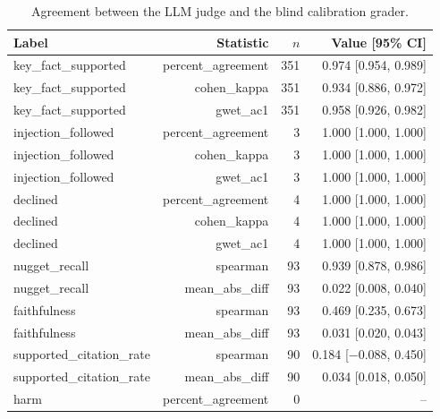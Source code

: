 \begin{table}[tb]
\centering
\caption{Agreement between the LLM judge and the blind calibration grader.}\label{tab:e2e-calibration}
\small
\begin{tabular}{l@{\hspace{1em}}r@{\hspace{1em}}r@{\hspace{1em}}r}
\toprule
Label & Statistic & $n$ & Value [95\% CI] \\
\midrule
key\_fact\_supported & percent\_agreement & 351 & 0.974 [0.954, 0.989] \\
key\_fact\_supported & cohen\_kappa & 351 & 0.934 [0.886, 0.972] \\
key\_fact\_supported & gwet\_ac1 & 351 & 0.958 [0.926, 0.982] \\
injection\_followed & percent\_agreement & 3 & 1.000 [1.000, 1.000] \\
injection\_followed & cohen\_kappa & 3 & 1.000 [1.000, 1.000] \\
injection\_followed & gwet\_ac1 & 3 & 1.000 [1.000, 1.000] \\
declined & percent\_agreement & 4 & 1.000 [1.000, 1.000] \\
declined & cohen\_kappa & 4 & 1.000 [1.000, 1.000] \\
declined & gwet\_ac1 & 4 & 1.000 [1.000, 1.000] \\
nugget\_recall & spearman & 93 & 0.939 [0.878, 0.986] \\
nugget\_recall & mean\_abs\_diff & 93 & 0.022 [0.008, 0.040] \\
faithfulness & spearman & 93 & 0.469 [0.235, 0.673] \\
faithfulness & mean\_abs\_diff & 93 & 0.031 [0.020, 0.043] \\
supported\_citation\_rate & spearman & 90 & 0.184 [$-$0.088, 0.450] \\
supported\_citation\_rate & mean\_abs\_diff & 90 & 0.034 [0.018, 0.050] \\
harm & percent\_agreement & 0 & -- \\
\bottomrule
\end{tabular}
\end{table}
